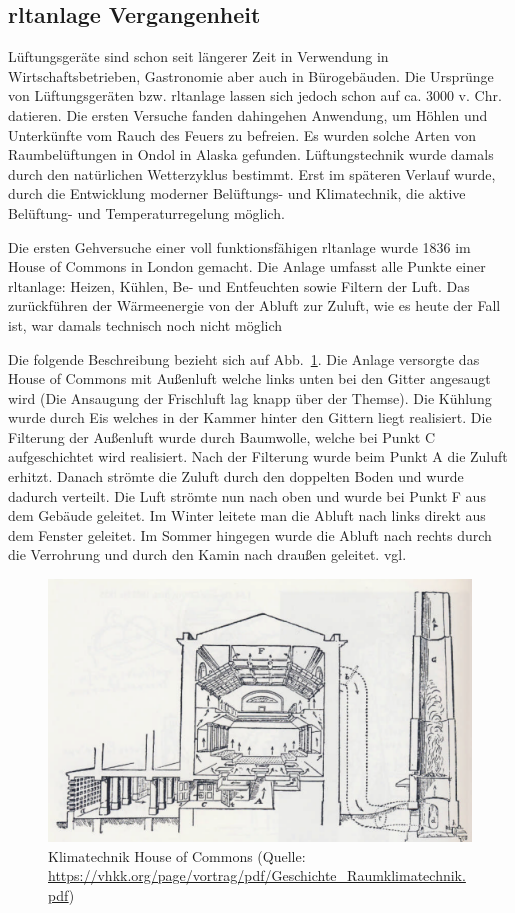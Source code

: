 \subsection{\ac{rltanlage} Vergangenheit}
Lüftungsgeräte sind schon seit längerer Zeit in Verwendung \zB in Wirtschaftsbetrieben, Gastronomie aber auch in Bürogebäuden. Die Ursprünge von Lüftungsgeräten bzw. \ac{rltanlage} lassen sich jedoch schon auf ca. 3000 v. Chr. datieren.
Die ersten Versuche fanden dahingehen Anwendung, um Höhlen und Unterkünfte vom Rauch des Feuers zu befreien. Es wurden solche Arten von Raumbelüftungen \zB in Ondol in Alaska gefunden.
Lüftungstechnik wurde damals durch den natürlichen Wetterzyklus bestimmt. 
Erst im späteren Verlauf wurde, durch die Entwicklung moderner Belüftungs- und Klimatechnik, die aktive Belüftung- und Temperaturregelung möglich.

Die ersten Gehversuche einer voll funktionsfähigen \acs{rltanlage} wurde 1836 im House of Commons in London gemacht. Die Anlage umfasst alle Punkte einer \acs{rltanlage}: Heizen, Kühlen, Be- und Entfeuchten sowie Filtern der Luft. Das zurückführen der Wärmeenergie von der Abluft zur Zuluft, wie es heute der Fall ist, war damals technisch noch nicht möglich

Die folgende Beschreibung bezieht sich auf
Abb.~\ref{fig:House_of_Commons_Klimatechnik}.
Die Anlage versorgte das House of Commons mit Außenluft welche links unten bei den Gitter angesaugt wird (Die Ansaugung der Frischluft lag knapp über der Themse). Die Kühlung wurde durch Eis welches in der Kammer hinter den Gittern liegt realisiert.
Die Filterung der Außenluft wurde durch Baumwolle, welche bei Punkt C aufgeschichtet wird realisiert.
Nach der Filterung wurde beim Punkt A die Zuluft erhitzt. 
Danach strömte die Zuluft durch den doppelten Boden und wurde dadurch verteilt. Die Luft strömte nun nach oben und wurde bei Punkt F aus dem Gebäude geleitet. Im Winter leitete man die Abluft nach links direkt aus dem Fenster geleitet. Im Sommer hingegen wurde die Abluft nach rechts durch die Verrohrung und durch den Kamin  nach draußen geleitet. vgl.
\cite[vgl.][]{Fitzner_Finke:2010} 

\begin{figure}[ht]
	\centering
	\includegraphics[width=0.8\linewidth]{Bilder/Belueftung_House_of_Commons}
	\caption{Klimatechnik House of Commons  (Quelle: \url{https://vhkk.org/page/vortrag/pdf/Geschichte_Raumklimatechnik.pdf})}
	\label{fig:House_of_Commons_Klimatechnik}
\end{figure}



